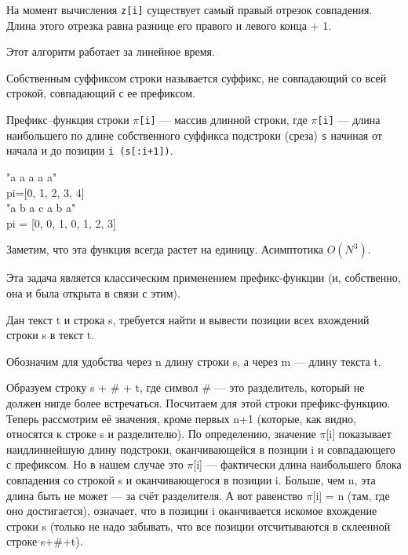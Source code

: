 \begin{lecture}[\lectureSubject]
\begin{lecSection}
На момент вычисления \texttt{z[i]} существует самый правый отрезок совпадения. Длина этого отрезка равна разнице его правого и левого конца + 1.

Этот алгоритм работает за линейное время.
	\end{lecSection}
	\begin{lecSection}
		Собственным суффиксом строки называется суффикс, не совпадающий со всей строкой, совпадающий с ее префиксом. 
		
		Префикс--функция строки \texttt{$\pi$[i]} --- массив длинной строки, где \texttt{$\pi$[i]} --- длина наибольшего по длине собственного суффикса подстроки (среза) \texttt{s} начиная от начала и до позиции \texttt{i (s[:i+1])}.
		\begin{center}
			"a a a a a"\\
			pi=[0, 1, 2, 3, 4]\\
			"a b a c a b a"\\
			pi = [0, 0, 1, 0, 1, 2, 3]\\
		\end{center}
		Заметим, что эта функция всегда растет на единицу.
		Асимптотика $O(N^3)$.
	\end{lecSection}
	
	\begin{lecSection}
		Эта задача является классическим применением префикс-функции (и, собственно, она и была открыта в связи с этим).
		
		Дан текст t и строка s, требуется найти и вывести позиции всех вхождений строки s в текст t.
		
		Обозначим для удобства через n длину строки s, а через m — длину текста t.
		
		Образуем строку s + \# + t, где символ \# — это разделитель, который не должен нигде более встречаться. Посчитаем для этой строки префикс-функцию. Теперь рассмотрим её значения, кроме первых n+1 (которые, как видно, относятся к строке s и разделителю). По определению, значение $\pi$[i] показывает наидлиннейшую длину подстроки, оканчивающейся в позиции i и совпадающего с префиксом. Но в нашем случае это $\pi$[i] — фактически длина наибольшего блока совпадения со строкой s и оканчивающегося в позиции i. Больше, чем n, эта длина быть не может — за счёт разделителя. А вот равенство $\pi$[i] = n (там, где оно достигается), означает, что в позиции i оканчивается искомое вхождение строки s (только не надо забывать, что все позиции отсчитываются в склеенной строке s+\#+t).
		

\end{lecSection}
\end{lecture}
